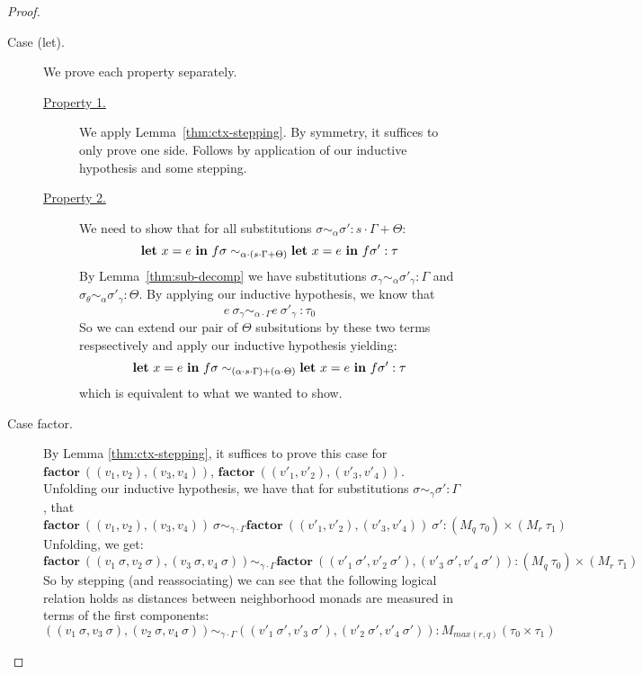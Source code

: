 \begin{proof}
\begin{description}
    \item[Case (let).] 
      We prove each property separately.
      \begin{description}
        \item[\underline{Property 1.}]
          We apply Lemma~\ref{thm:ctx-stepping}. By symmetry, it suffices to
          only prove one side. Follows by application of our inductive
          hypothesis and some stepping.
        \item[\underline{Property 2.}]
          We need to show that for all substitutions $\sigma \sim_{\alpha} \sigma' :
          s \cdot \Gamma + \Theta$:
          $$
          \textbf{let} \ x = e \ \textbf{in} \ f \sigma 
            \sim_{\alpha \cdot (s \cdot \Gamma + \Theta)}
          \textbf{let} \ x = e \ \textbf{in} \ f \sigma' :
          \tau
          $$
          By Lemma~\ref{thm:sub-decomp} we have substitutions $\sigma_{\gamma}
          \sim_\alpha \sigma'_{\gamma} : \Gamma$ and $\sigma_{\theta}
          \sim_\alpha \sigma'_{\gamma} : \Theta$. By applying our inductive
          hypothesis, we know that 
          $$
          e~\sigma_{\gamma} \sim_{\alpha \cdot \Gamma}
          e~\sigma'_{\gamma} \ : \tau_0
          $$
          So we can extend our pair of $\Theta$ subsitutions by these two terms
          respsectively and apply our inductive hypothesis yielding:
          $$
          \textbf{let} \ x = e \ \tin \ f \sigma 
            \sim_{(\alpha \cdot s \cdot \Gamma) + (\alpha \cdot \Theta)}
          \textbf{let} \ x = e \ \tin \ f \sigma' :
          \tau
          $$
          which is equivalent to what we wanted to show.

      \end{description}

    \item[Case factor.] 
      By Lemma \ref{thm:ctx-stepping}, it suffices to prove this case for 
      $\mathbf{factor}~((v_1, v_2), (v_3, v_4))$, 
      $\mathbf{factor}~((v'_1, v'_2), (v'_3, v'_4))$. 
      Unfolding our inductive hypothesis, we have that for substitutions
      $\sigma \sim_{\gamma} \sigma' : \Gamma$, that 
      $$
      \textbf{factor} \ ((v_1, v_2), (v_3, v_4))~\sigma 
      \sim_{\gamma \cdot \Gamma} 
      \textbf{factor} \ ((v'_1, v'_2), (v'_3, v'_4))~\sigma' 
      : (M_q~\tau_0) \times (M_r~\tau_1)
      $$
      Unfolding, we get:
      $$
      \textbf{factor} \ ((v_1~\sigma, v_2~\sigma), (v_3~\sigma, v_4~\sigma)) 
      \sim_{\gamma \cdot \Gamma} 
      \textbf{factor} \ ((v'_1~\sigma', v'_2~\sigma'), (v'_3~\sigma', v'_4~\sigma')) 
      : (M_q~\tau_0) \times (M_r~\tau_1)
      $$
      So by stepping (and reassociating) we can see that the following logical
      relation holds as distances between neighborhood monads are measured in
      terms of the first components:
      $$
      ((v_1~\sigma, v_3~\sigma), (v_2~\sigma, v_4~\sigma)) 
      \sim_{\gamma \cdot \Gamma} 
      ((v'_1~\sigma', v'_3~\sigma'), (v'_2~\sigma', v'_4~\sigma')) 
      : M_{max(r,q)}(\tau_0 \times \tau_1)
      $$


\end{description}
\end{proof}
